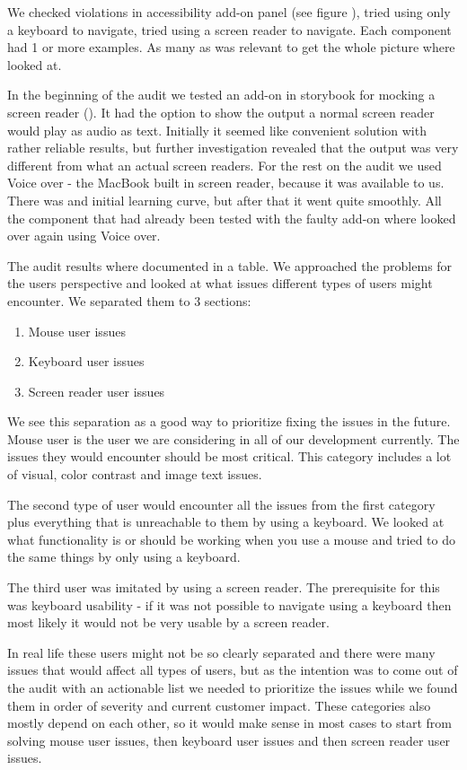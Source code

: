 \documentclass{master_thesis}
\begin{document}
We checked violations in accessibility add-on panel (see figure ), tried using only a keyboard to navigate, tried using a screen reader to navigate. Each component had 1 or more examples. As many as was relevant to get the whole picture where looked at.

In the beginning of the audit we tested an add-on in storybook for mocking a screen reader (). It had the option to show the output a normal screen reader would play as audio as text. Initially it seemed like convenient solution with rather reliable results, but further investigation revealed that the output was very different from what an actual screen readers. For the rest on the audit we used Voice over - the MacBook built in screen reader, because it was available to us. There was and initial learning curve, but after that it went quite smoothly. All the component that had already been tested with the faulty add-on where looked over again using Voice over.

The audit results where documented in a table. We approached the problems for the users perspective and looked at what issues different types of users might encounter. We separated them to 3 sections:
\begin{enumerate}
	\item Mouse user issues
	\item Keyboard user issues
	\item Screen reader user issues
\end{enumerate}

We see this separation as a good way to prioritize  fixing the issues in the future. Mouse user is the user we are considering in all of our development currently. The issues they would encounter should be most critical. This category includes a lot of visual, color contrast and image text issues.

The second type of user would encounter all the issues from the first category plus everything that is unreachable to them by using a keyboard. We looked at what functionality is or should be working when you use a mouse and tried to do the same things by only using a keyboard.

The third user was imitated by using a screen reader. The prerequisite for this was keyboard usability - if it was not possible to navigate using a keyboard then most likely it would not be very usable by a screen reader.

In real life these users might not be so clearly separated and there were many issues that would affect all types of users, but as the intention was to come out of the audit with an actionable list we needed to prioritize the issues while we found them in order of severity and current customer impact. These categories also mostly depend on each other, so it would make sense in most cases to start from solving mouse user issues, then keyboard user issues and then screen reader user issues.
\end{document}
